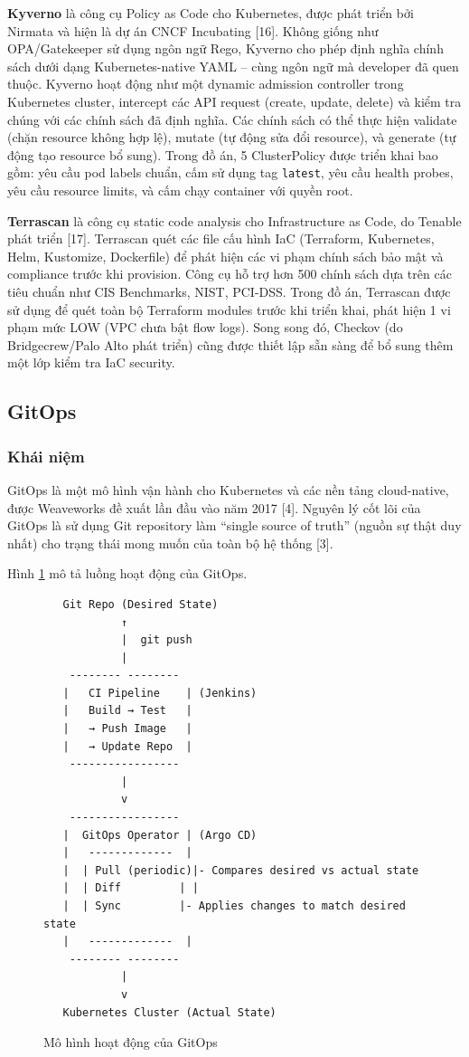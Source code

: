 \documentclass[13pt,a4paper,twoside]{extarticle}
\begin{document}
\textbf{Kyverno} là công cụ Policy as Code cho Kubernetes, được phát triển bởi Nirmata và hiện là dự án CNCF Incubating [16]. Không giống như OPA/Gatekeeper sử dụng ngôn ngữ Rego, Kyverno cho phép định nghĩa chính sách dưới dạng Kubernetes-native YAML -- cùng ngôn ngữ mà developer đã quen thuộc. Kyverno hoạt động như một dynamic admission controller trong Kubernetes cluster, intercept các API request (create, update, delete) và kiểm tra chúng với các chính sách đã định nghĩa. Các chính sách có thể thực hiện validate (chặn resource không hợp lệ), mutate (tự động sửa đổi resource), và generate (tự động tạo resource bổ sung). Trong đồ án, 5 ClusterPolicy được triển khai bao gồm: yêu cầu pod labels chuẩn, cấm sử dụng tag \texttt{latest}, yêu cầu health probes, yêu cầu resource limits, và cấm chạy container với quyền root.

\textbf{Terrascan} là công cụ static code analysis cho Infrastructure as Code, do Tenable phát triển [17]. Terrascan quét các file cấu hình IaC (Terraform, Kubernetes, Helm, Kustomize, Dockerfile) để phát hiện các vi phạm chính sách bảo mật và compliance trước khi provision. Công cụ hỗ trợ hơn 500 chính sách dựa trên các tiêu chuẩn như CIS Benchmarks, NIST, PCI-DSS. Trong đồ án, Terrascan được sử dụng để quét toàn bộ Terraform modules trước khi triển khai, phát hiện 1 vi phạm mức LOW (VPC chưa bật flow logs). Song song đó, Checkov (do Bridgecrew/Palo Alto phát triển) cũng được thiết lập sẵn sàng để bổ sung thêm một lớp kiểm tra IaC security.

\subsection{GitOps}

\subsubsection{Khái niệm}

GitOps là một mô hình vận hành cho Kubernetes và các nền tảng cloud-native, được Weaveworks đề xuất lần đầu vào năm 2017 [4]. Nguyên lý cốt lõi của GitOps là sử dụng Git repository làm ``single source of truth'' (nguồn sự thật duy nhất) cho trạng thái mong muốn của toàn bộ hệ thống [3].

Hình \ref{fig:gitops} mô tả luồng hoạt động của GitOps.

\begin{figure}[H]
\centering
\begin{verbatim}
   Git Repo (Desired State)
            ↑
            |  git push
            |
    -------- -------- 
   |   CI Pipeline    | (Jenkins)
   |   Build → Test   |
   |   → Push Image   |
   |   → Update Repo  |
    ----------------- 
            |
            v
    ----------------- 
   |  GitOps Operator | (Argo CD)
   |   -------------  |
   |  | Pull (periodic)|- Compares desired vs actual state
   |  | Diff         | |
   |  | Sync         |- Applies changes to match desired state
   |   -------------  |
    -------- -------- 
            |
            v
   Kubernetes Cluster (Actual State)
\end{verbatim}
\caption{Mô hình hoạt động của GitOps}
\label{fig:gitops}
\end{figure}
\end{document}
